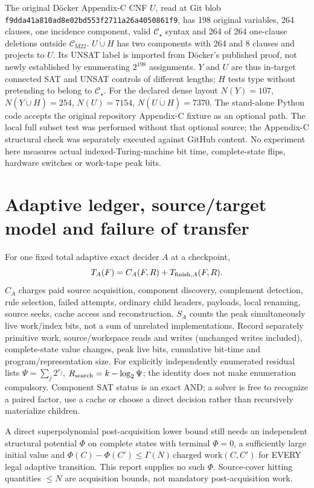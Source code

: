 \documentclass[11pt]{article}
\newcommand{\CM}{\mathcal C_{\mathrm{M22}}}
\newcommand{\CS}{\mathcal C_{\star}}
\begin{document}
The original D\"ocker Appendix-C CNF $U$, read at Git blob \texttt{f9dda41a810ad8e02bd553f2711a26a4050861f9}, has 198 original variables, 264 clauses, one incidence component, valid $\CS$ syntax and 264 of 264 one-clause deletions outside $\CM$. $U\dot\cup H$ has two components with 264 and 8 clauses and projects to $U$. Its UNSAT label is imported from D\"ocker's published proof, not newly established by enumerating $2^{198}$ assignments. $Y$ and $U$ are thus in-target connected SAT and UNSAT controls of different lengths; $H$ tests type without pretending to belong to $\CS$. For the declared dense layout $N(Y)=107$, $N(Y\dot\cup H)=254$, $N(U)=7154$, $N(U\dot\cup H)=7370$. The stand-alone Python code accepts the original repository Appendix-C fixture as an optional path. The local full subset test was performed without that optional source; the Appendix-C structural check was separately executed against GitHub content. No experiment here measures actual indexed-Turing-machine bit time, complete-state flips, hardware switches or work-tape peak bits.

\section{Adaptive ledger, source/target model and failure of transfer}
For one fixed total adaptive exact decider $A$ at a checkpoint,
\[
T_A(F)=C_A(F,R)+T_{{\rm finish},A}(F,R).
\]
$C_A$ charges paid source acquisition, component discovery, complement detection, rule selection, failed attempts, ordinary child headers, payloads, local renaming, source seeks, cache access and reconstruction. $S_A$ counts the peak simultaneously live work/index bits, not a sum of unrelated implementations. Record separately primitive work, source/workspace reads and writes (unchanged writes included), complete-state value changes, peak live bits, cumulative bit-time and program/representation size. For explicitly independently enumerated residual lists $\Psi=\sum_j2^{r_j}$, $R_{\rm search}=k-\log_2\Psi$; the identity does not make enumeration compulsory. Component SAT status is an exact AND; a solver is free to recognize a paired factor, use a cache or choose a direct decision rather than recursively materialize children.

A direct superpolynomial post-acquisition lower bound still needs an independent structural potential $\Phi$ on complete states with terminal $\Phi=0$, a sufficiently large initial value and $\Phi(C)-\Phi(C')\le\Gamma(N)\,\text{charged work}(C,C')$ for EVERY legal adaptive transition. This report supplies no such $\Phi$. Source-cover hitting quantities $\le N$ are acquisition bounds, not mandatory post-acquisition work.
\end{document}
